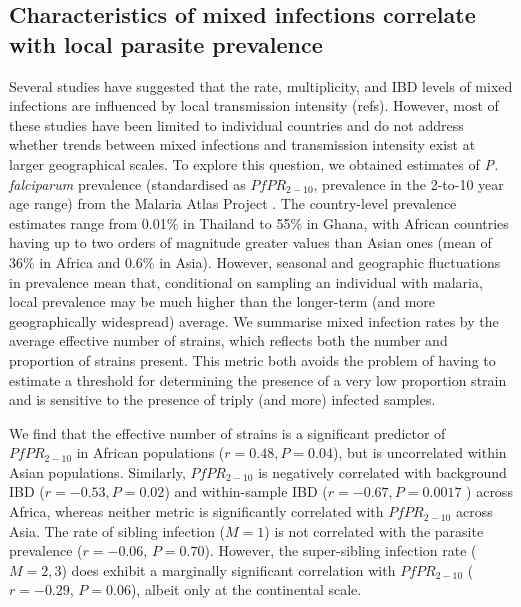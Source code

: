\documentclass[9pt,lineno]{elife}
\begin{document}
\subsection{Characteristics of mixed infections correlate with local parasite prevalence}

Several studies have suggested that the rate, multiplicity, and IBD levels of mixed infections are influenced by local transmission intensity (refs). However, most of these studies have been limited to individual countries and do not address whether trends between mixed infections and transmission intensity exist at larger geographical scales. To explore this question, we obtained estimates of {\it P. falciparum} prevalence (standardised as $PfPR_{2-10}$, prevalence in the 2-to-10 year age range) from the Malaria Atlas Project \citep[see Table~\ref{tab:Pf3k}]{MAP2017}. The country-level prevalence estimates range from 0.01\% in Thailand to 55\% in Ghana, with African countries having up to two orders of magnitude greater values than Asian ones (mean of 36\% in Africa and 0.6\% in Asia). However, seasonal and geographic fluctuations in prevalence mean that, conditional on sampling an individual with malaria, local prevalence may be much higher than the longer-term (and more geographically widespread) average. We summarise mixed infection rates by the average effective number of strains, which reflects both the number and proportion of strains present.  This metric both avoids the problem of having to estimate a threshold for determining the presence of a very low proportion strain and is sensitive to the presence of triply (and more) infected samples.

We find that the effective number of strains is a significant predictor of $PfPR_{2-10}$ in African populations ($r=0.48, P=0.04$), but is uncorrelated within Asian populations. Similarly, $PfPR_{2-10}$ is negatively correlated with background IBD ($r = -0.53, P=0.02$) and within-sample IBD ($r= -0.67, P=0.0017$ ) across Africa, whereas neither metric is significantly correlated with $PfPR_{2-10}$ across Asia.  The rate of sibling infection ($M=1$) is not correlated with the parasite prevalence ($r=-0.06$, $P=0.70$). However, the super-sibling infection rate ($M=2, 3$) does exhibit a marginally significant correlation with $PfPR_{2-10}$ ($r=-0.29$, $P=0.06$), albeit only at the continental scale.
\end{document}
